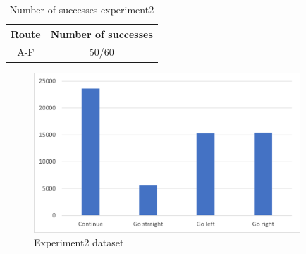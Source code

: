   \begin{table}[htb]
    \centering
    \caption{Number of successes experiment2}
    \begin{tabular}{|c|c|}
    \hline
    Route & Number of successes \\ \hline
    A-F     & 50/60                  \\ \hline
    \end{tabular}
    \label{tb::exp2suc}
    \vspace{2zh}
    \end{table} 
    \begin{figure}[ht]
      \centering
      \includegraphics[width = 10cm]{./figs/exp2_result.png}
      \caption{Experiment2 dataset}
      \label{fig::exp2_result}
    \end{figure}